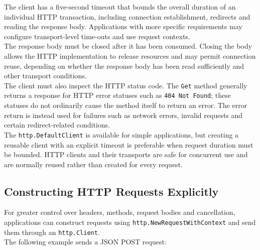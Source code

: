 The client has a five-second timeout that bounds the overall duration of an individual HTTP transaction, including connection establishment, redirects and reading the response body. Applications with more specific requirements may configure transport-level time-outs and use request contexts.\\

The response body must be closed after it has been consumed. Closing the body allows the HTTP implementation to release resources and may permit connection reuse, depending on whether the response body has been read sufficiently and other transport conditions.\\

The client must also inspect the HTTP status code. The \texttt{Get} method generally returns a response for HTTP error statuses such as \texttt{404 Not Found}; these statuses do not ordinarily cause the method itself to return an error. The error return is instead used for failures such as network errors, invalid requests and certain redirect-related conditions.\\

The \texttt{http.DefaultClient} is available for simple applications, but creating a reusable client with an explicit timeout is preferable when request duration must be bounded. HTTP clients and their transports are safe for concurrent use and are normally reused rather than created for every request.

\subsection{Constructing HTTP Requests Explicitly}

For greater control over headers, methods, request bodies and cancellation, applications can construct requests using \texttt{http.NewRequestWithContext} and send them through an \texttt{http.Client}.\\

The following example sends a JSON POST request:

